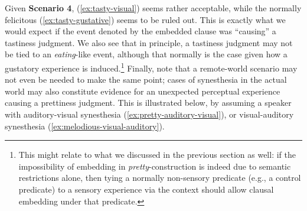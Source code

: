 \documentclass[11pt]{article}
\begin{document}
Given \textbf{Scenario 4}, (\ref{ex:tasty-visual}) seems rather acceptable, while the normally felicitous (\ref{ex:tasty-gustative}) seems to be ruled out. This is exactly what we would expect if the event denoted by the embedded clause was ``causing'' a tastiness judgment. We also see that in principle, a tastiness judgment may not be tied to an \textit{eating}-like event, although that normally is the case given how a gustatory experience is induced.\footnote{This might relate to what we discussed in the previous section as well: if the impossibility of embedding in \textit{pretty}-construction is indeed due to semantic restrictions alone, then tying a normally non-sensory predicate (e.g., a control predicate) to a sensory experience via the context should allow clausal embedding under that predicate.} Finally, note that a remote-world scenario may not even be needed to make the same point; cases of synesthesia in the actual world may also constitute evidence for an unexpected perceptual experience causing a prettiness judgment. This is illustrated below, by assuming a speaker with auditory-visual synesthesia (\ref{ex:pretty-auditory-visual}), or visual-auditory synesthesia (\ref{ex:melodious-visual-auditory}).
\begin{exe}
	\ex 
	\begin{xlist}
		\label{ex:pretty-auditory-visual}
		\label{ex:melodious-visual-auditory}
	\end{xlist}
\end{exe}
\end{document}
